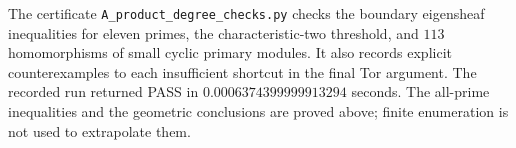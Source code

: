 \begin{remark}
\label{rem:OC-product-degree-checks}
The certificate \texttt{A\_product\_degree\_checks.py} checks the boundary eigensheaf inequalities for eleven primes, the characteristic-two threshold, and $113$ homomorphisms of small cyclic primary modules.  It also records explicit counterexamples to each insufficient shortcut in the final Tor argument.  The recorded run returned PASS in $0.0006374399999913294$ seconds.  The all-prime inequalities and the geometric conclusions are proved above; finite enumeration is not used to extrapolate them.
\end{remark}
